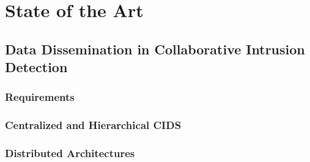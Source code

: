 \chapter{State of the Art}

\section{Data Dissemination in Collaborative Intrusion Detection}

\subsection{Requirements}

\subsection{Centralized and Hierarchical CIDS}

\subsection{Distributed Architectures}

